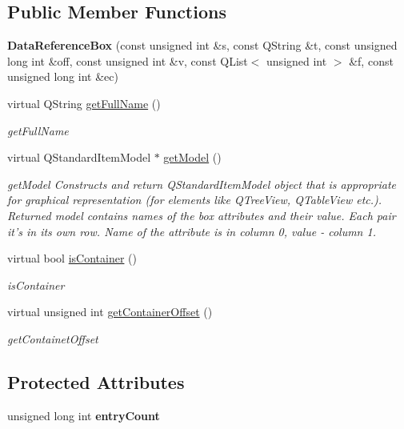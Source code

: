 \subsection*{Public Member Functions}
\begin{DoxyCompactItemize}
\item 
\hypertarget{class_data_reference_box_afad4046c4c7cb27fdbc4b007c8fc70b0}{{\bfseries Data\-Reference\-Box} (const unsigned int \&s, const Q\-String \&t, const unsigned long int \&off, const unsigned int \&v, const Q\-List$<$ unsigned int $>$ \&f, const unsigned long int \&ec)}\label{class_data_reference_box_afad4046c4c7cb27fdbc4b007c8fc70b0}

\item 
virtual Q\-String \hyperlink{class_data_reference_box_ac023a9fd6a4177dbe16569d3ced7fd1e}{get\-Full\-Name} ()
\begin{DoxyCompactList}\small\item\em get\-Full\-Name \end{DoxyCompactList}\item 
virtual Q\-Standard\-Item\-Model $\ast$ \hyperlink{class_data_reference_box_af73f1f378a20d2f705327cc815dc7396}{get\-Model} ()
\begin{DoxyCompactList}\small\item\em get\-Model Constructs and return Q\-Standard\-Item\-Model object that is appropriate for graphical representation (for elements like Q\-Tree\-View, Q\-Table\-View etc.). Returned model contains names of the box attributes and their value. Each pair it's in its own row. Name of the attribute is in column 0, value -\/ column 1. \end{DoxyCompactList}\item 
virtual bool \hyperlink{class_data_reference_box_ad78cbb0eb0ba1f25aee966178e4f2f0e}{is\-Container} ()
\begin{DoxyCompactList}\small\item\em is\-Container \end{DoxyCompactList}\item 
virtual unsigned int \hyperlink{class_data_reference_box_a509baa8527d8fc5ff1d61d4e2508172f}{get\-Container\-Offset} ()
\begin{DoxyCompactList}\small\item\em get\-Containet\-Offset \end{DoxyCompactList}\end{DoxyCompactItemize}
\subsection*{Protected Attributes}
\begin{DoxyCompactItemize}
\item 
\hypertarget{class_data_reference_box_aa789209cf665ff99ab5b802487fce8e7}{unsigned long int {\bfseries entry\-Count}}\label{class_data_reference_box_aa789209cf665ff99ab5b802487fce8e7}

\end{DoxyCompactItemize}


